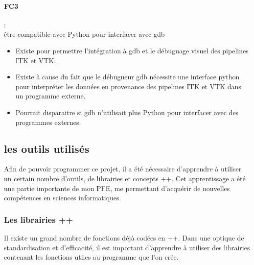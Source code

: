 \paragraph*{FC3} :\\ être compatible avec Python pour interfacer avec gdb
\begin{itemize}
  \item Existe pour permettre l'intégration à gdb et le débuguage visuel des pipelines ITK et VTK.
  \item Existe à cause du fait que le débugueur gdb nécessite une interface python 
  pour interpréter les données en provenance 
  des pipelines ITK et VTK dans un programme externe.
  \item Pourrait disparaitre si gdb n'utilisait plus Python 
  pour interfacer avec des programmes externes.
\end{itemize}

\subsection{les outils utilisés}
Afin de pouvoir programmer ce projet,
il a été nécessaire d'apprendre à utiliser un certain nombre d'outils,
de librairies et concepts {\C++}. Cet apprentissage a été une
partie importante de mon PFE, me permettant d'acquérir de
nouvelles compétences en sciences informatiques.
\subsubsection{Les librairies \C++}
Il existe un grand nombre de fonctions déjà codées en {\C++}.
Dans une optique de standardisation et d'efficacité, il est important d'apprendre
à utiliser des librairies contenant les fonctions utiles au programme que l'on crée.

